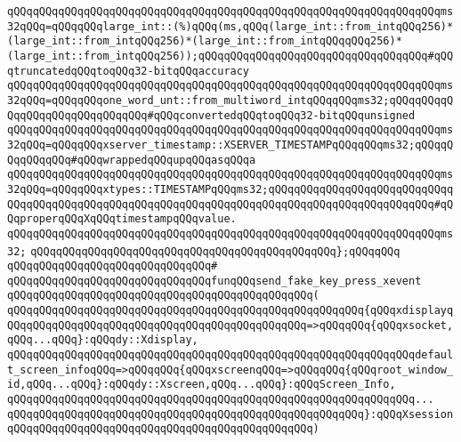 \newline
\verb|qQQqqQQqqQQqqQQqqQQqqQQqqQQqqQQqqQQqqQQqqQQqqQQqqQQqqQQqqQQqqQQqqQQqms32qQQq=qQQqqQQqlarge_int::(%)qQQq(ms,qQQq(large_int::from_intqQQq256)*(large_int::from_intqQQq256)*(large_int::from_intqQQqqQQq256)*(large_int::from_intqQQq256));qQQqqQQqqQQqqQQqqQQqqQQqqQQqqQQqqQQq#qQQqtruncatedqQQqtoqQQq32-bitqQQqaccuracy|\newline
\verb|qQQqqQQqqQQqqQQqqQQqqQQqqQQqqQQqqQQqqQQqqQQqqQQqqQQqqQQqqQQqqQQqqQQqms32qQQq=qQQqqQQqone_word_unt::from_multiword_intqQQqqQQqms32;qQQqqQQqqQQqqQQqqQQqqQQqqQQqqQQq#qQQqconvertedqQQqtoqQQq32-bitqQQqunsigned|\newline
\newline
\verb|qQQqqQQqqQQqqQQqqQQqqQQqqQQqqQQqqQQqqQQqqQQqqQQqqQQqqQQqqQQqqQQqqQQqms32qQQq=qQQqqQQqxserver_timestamp::XSERVER_TIMESTAMPqQQqqQQqms32;qQQqqQQqqQQqqQQq#qQQqwrappedqQQqupqQQqasqQQqa|\newline
\verb|qQQqqQQqqQQqqQQqqQQqqQQqqQQqqQQqqQQqqQQqqQQqqQQqqQQqqQQqqQQqqQQqqQQqms32qQQq=qQQqqQQqxtypes::TIMESTAMPqQQqms32;qQQqqQQqqQQqqQQqqQQqqQQqqQQqqQQqqQQqqQQqqQQqqQQqqQQqqQQqqQQqqQQqqQQqqQQqqQQqqQQqqQQqqQQqqQQqqQQq#qQQqproperqQQqXqQQqtimestampqQQqvalue.|\newline
\verb|qQQqqQQqqQQqqQQqqQQqqQQqqQQqqQQqqQQqqQQqqQQqqQQqqQQqqQQqqQQqqQQqqQQqms32;|\newline
\verb|qQQqqQQqqQQqqQQqqQQqqQQqqQQqqQQqqQQqqQQqqQQqqQQq};qQQqqQQq|\newline
\verb|qQQqqQQqqQQqqQQqqQQqqQQqqQQqqQQq#|\newline
\verb|qQQqqQQqqQQqqQQqqQQqqQQqqQQqqQQqfunqQQqsend_fake_key_press_xevent|\newline
\verb|qQQqqQQqqQQqqQQqqQQqqQQqqQQqqQQqqQQqqQQqqQQqqQQq(|\newline
\verb|qQQqqQQqqQQqqQQqqQQqqQQqqQQqqQQqqQQqqQQqqQQqqQQqqQQqqQQq{qQQqxdisplayqQQqqQQqqQQqqQQqqQQqqQQqqQQqqQQqqQQqqQQqqQQqqQQq=>qQQqqQQq{qQQqxsocket,qQQq...qQQq}:qQQqdy::Xdisplay,|\newline
\verb|qQQqqQQqqQQqqQQqqQQqqQQqqQQqqQQqqQQqqQQqqQQqqQQqqQQqqQQqqQQqqQQqdefault_screen_infoqQQq=>qQQqqQQq{qQQqxscreenqQQq=>qQQqqQQq{qQQqroot_window_id,qQQq...qQQq}:qQQqdy::Xscreen,qQQq...qQQq}:qQQqScreen_Info,|\newline
\verb|qQQqqQQqqQQqqQQqqQQqqQQqqQQqqQQqqQQqqQQqqQQqqQQqqQQqqQQqqQQqqQQq...|\newline
\verb|qQQqqQQqqQQqqQQqqQQqqQQqqQQqqQQqqQQqqQQqqQQqqQQqqQQqqQQq}:qQQqXsession|\newline
\verb|qQQqqQQqqQQqqQQqqQQqqQQqqQQqqQQqqQQqqQQqqQQqqQQq)|\newline
